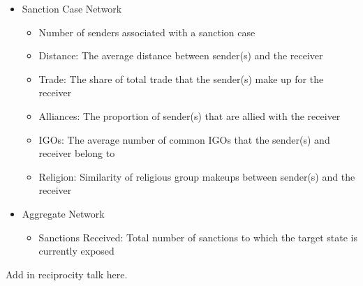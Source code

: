 \begin{itemize}
	\item Sanction Case Network
	\begin{itemize}
		\item Number of senders associated with a sanction case
		\item Distance: The average distance between sender(s) and the receiver
		\item Trade: The share of total trade that the sender(s) make up for the receiver		
		\item Alliances: The proportion of sender(s) that are allied with the receiver
		\item IGOs: The average number of common IGOs that the sender(s) and receiver belong to
		\item Religion: Similarity of religious group makeups between sender(s) and the receiver
	\end{itemize}
	\item Aggregate Network
	\begin{itemize}
		\item Sanctions Received: Total number of sanctions to which the target state is currently exposed
	\end{itemize}
\end{itemize}

Add in reciprocity talk here. 